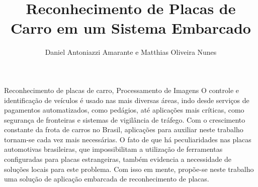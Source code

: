 \documentclass[portuguese,oneside]{tcc}
\author{Daniel Antoniazzi Amarante e Matthias Oliveira Nunes}
\title{Reconhecimento de Placas de Carro em um Sistema Embarcado}
      {Car License Plate Recognition in a Embedded System}
\begin{document}







\begin{resumo}{Reconhecimento de placas de carro, Processamento de Imagens}
O controle e identificação de veículos é usado nas mais diversas áreas, indo
desde serviços de pagamentos automatizados, como pedágios, até aplicações
mais críticas, como segurança de fronteiras e sistemas de vigilância de
tráfego. Com o crescimento constante da frota de carros no Brasil,
aplicações para auxiliar neste trabalho tornam-se cada vez mais necessárias. O fato de que há peculiaridades nas placas automotivas brasileiras, que impossibilitam a utilização de ferramentas configuradas para placas estrangeiras, também evidencia a necessidade de soluções locais para este problema. Com isso em mente, propõe-se neste trabalho uma solução de aplicação embarcada de reconhecimento de placas.
\end{resumo}
\end{document}
